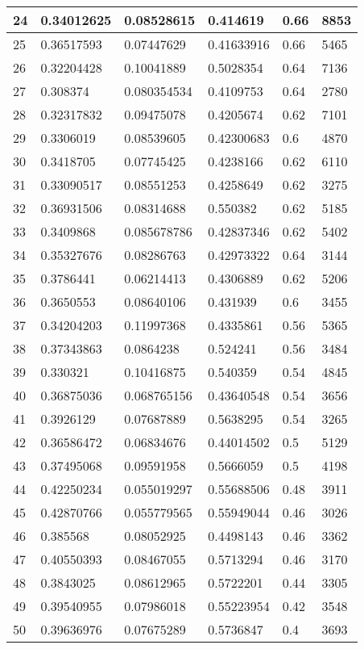 \begin{longtable}{|l|l|l|l|l|l|}
24 & 0.34012625 & 0.08528615 & 0.414619 & 0.66 & 8853 \\ \hline 
25 & 0.36517593 & 0.07447629 & 0.41633916 & 0.66 & 5465 \\ \hline 
26 & 0.32204428 & 0.10041889 & 0.5028354 & 0.64 & 7136 \\ \hline 
27 & 0.308374 & 0.080354534 & 0.4109753 & 0.64 & 2780 \\ \hline 
28 & 0.32317832 & 0.09475078 & 0.4205674 & 0.62 & 7101 \\ \hline 
29 & 0.3306019 & 0.08539605 & 0.42300683 & 0.6 & 4870 \\ \hline 
30 & 0.3418705 & 0.07745425 & 0.4238166 & 0.62 & 6110 \\ \hline 
31 & 0.33090517 & 0.08551253 & 0.4258649 & 0.62 & 3275 \\ \hline 
32 & 0.36931506 & 0.08314688 & 0.550382 & 0.62 & 5185 \\ \hline 
33 & 0.3409868 & 0.085678786 & 0.42837346 & 0.62 & 5402 \\ \hline 
34 & 0.35327676 & 0.08286763 & 0.42973322 & 0.64 & 3144 \\ \hline 
35 & 0.3786441 & 0.06214413 & 0.4306889 & 0.62 & 5206 \\ \hline 
36 & 0.3650553 & 0.08640106 & 0.431939 & 0.6 & 3455 \\ \hline 
37 & 0.34204203 & 0.11997368 & 0.4335861 & 0.56 & 5365 \\ \hline 
38 & 0.37343863 & 0.0864238 & 0.524241 & 0.56 & 3484 \\ \hline 
39 & 0.330321 & 0.10416875 & 0.540359 & 0.54 & 4845 \\ \hline 
40 & 0.36875036 & 0.068765156 & 0.43640548 & 0.54 & 3656 \\ \hline 
41 & 0.3926129 & 0.07687889 & 0.5638295 & 0.54 & 3265 \\ \hline 
42 & 0.36586472 & 0.06834676 & 0.44014502 & 0.5 & 5129 \\ \hline 
43 & 0.37495068 & 0.09591958 & 0.5666059 & 0.5 & 4198 \\ \hline 
44 & 0.42250234 & 0.055019297 & 0.55688506 & 0.48 & 3911 \\ \hline 
45 & 0.42870766 & 0.055779565 & 0.55949044 & 0.46 & 3026 \\ \hline 
46 & 0.385568 & 0.08052925 & 0.4498143 & 0.46 & 3362 \\ \hline 
47 & 0.40550393 & 0.08467055 & 0.5713294 & 0.46 & 3170 \\ \hline 
48 & 0.3843025 & 0.08612965 & 0.5722201 & 0.44 & 3305 \\ \hline 
49 & 0.39540955 & 0.07986018 & 0.55223954 & 0.42 & 3548 \\ \hline 
50 & 0.39636976 & 0.07675289 & 0.5736847 & 0.4 & 3693 \\ \hline 
\end{longtable}
